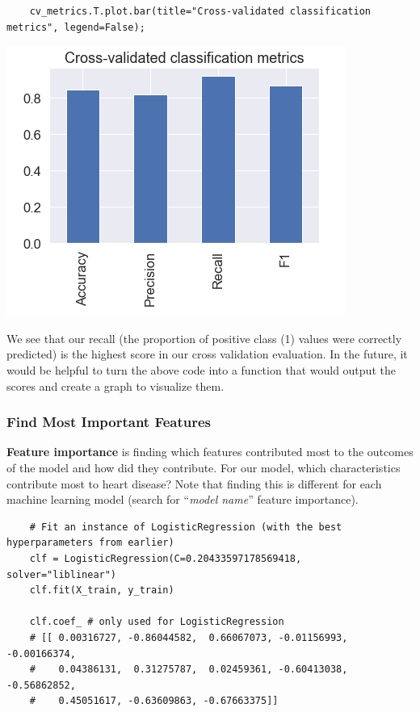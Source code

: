 \documentclass[11pt, a4paper]{article}
\begin{document}
\begin{spacing}{1.1}
\begin{lstlisting}
	cv_metrics.T.plot.bar(title="Cross-validated classification metrics", legend=False); \end{lstlisting} \vspace*{1mm}
	\begin{minipage}[c]{9cm}
	\includegraphics[scale=.8]{cv_mp}
	\end{minipage}
	\begin{minipage}[c]{8cm}
	We see that our recall (the proportion of positive class (1) values were correctly predicted) is the highest score in our cross validation evaluation. In the future, it would be helpful to turn the above code into a function that would output the scores and create a graph to visualize them. 
	\end{minipage} \newpage

	\subsubsection{Find Most Important Features}
	\textbf{Feature importance} is finding which features contributed most to the outcomes of the model and how did they contribute. For our model, which characteristics contribute most to heart disease? Note that finding this is different for each machine learning model (search for ``\textit{model name}'' feature importance). 
	\begin{lstlisting}
	# Fit an instance of LogisticRegression (with the best hyperparameters from earlier)
	clf = LogisticRegression(C=0.20433597178569418,	solver="liblinear")
	clf.fit(X_train, y_train)
	
	clf.coef_ # only used for LogisticRegression
	# [[ 0.00316727, -0.86044582,  0.66067073, -0.01156993, -0.00166374,
	#    0.04386131,  0.31275787,  0.02459361, -0.60413038, -0.56862852,
	#    0.45051617, -0.63609863, -0.67663375]]
	

\end{lstlisting}
\end{spacing}
\end{document}
